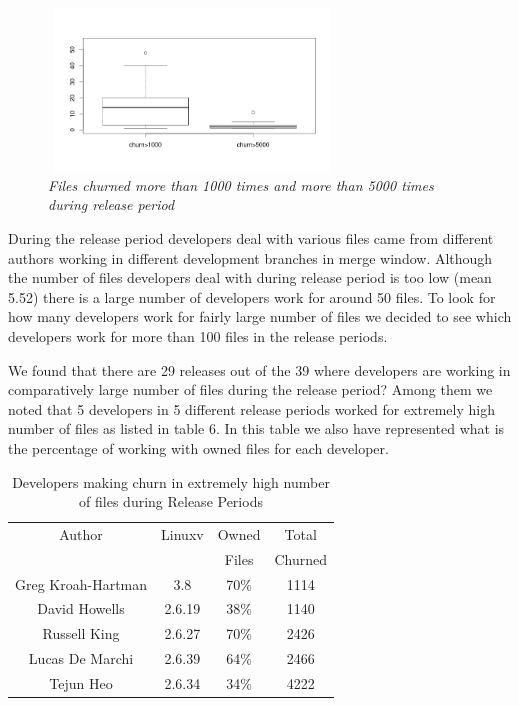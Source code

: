 \documentclass{acm_proc_article-sp}
\begin{document}
\begin{figure}
\begin{center}
\includegraphics[height=1.7in,width=3in]{fileChurnRPExp1000vs5000box.png}
\caption{\small \sl Files churned more than 1000 times and more than 5000 times during release period}
\end{center}
\end{figure}

During the release period developers deal with various files came from different authors working in different development branches in merge window. Although the number of files developers deal with during release period is too low (mean 5.52) there is a large number of developers work for around 50 files. To look for how many developers work for fairly large number of files we decided to see which developers work for more than 100 files in the release periods.

We found that there are 29 releases out of the 39 where developers are working in comparatively large number of files during the release period? Among them we noted that 5 developers in 5 different release periods worked for extremely high number of files as listed in table 6. In this table we also have represented what is the percentage of working with owned files for each developer.

\begin{table}[ht]
\caption{Developers making churn in extremely high number of files during Release Periods}  %
\centering 						%
\begin{tabular}{c c c c}				%
\hline\hline						%
Author 						& Linuxv		& Owned 			& Total \\
							& 			& Files				& Churned \\ [1ex]
\hline 							%
Greg Kroah-Hartman			& 3.8		& 70\%				& 1114\\
David Howells				& 2.6.19		& 38\%				& 1140\\
Russell King					& 2.6.27		& 70\%				& 2426\\
Lucas De Marchi				& 2.6.39		& 64\% 				& 2466\\
Tejun Heo					& 2.6.34		& 34\% 				& 4222\\
[1ex]							%
\hline 							%
\end{tabular}
\label{table:nonlin} 				%
\end{table}
\end{document}
